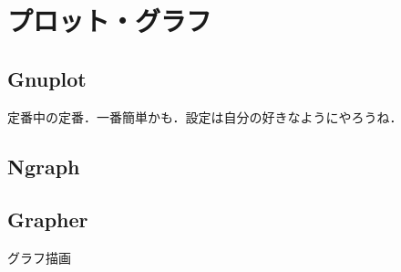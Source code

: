 ﻿\chapter{プロット・グラフ}

\begin{abstract}
 
\end{abstract}

\section{Gnuplot}

定番中の定番．一番簡単かも．設定は自分の好きなようにやろうね．


\section{Ngraph}




\section{Grapher}

グラフ描画

